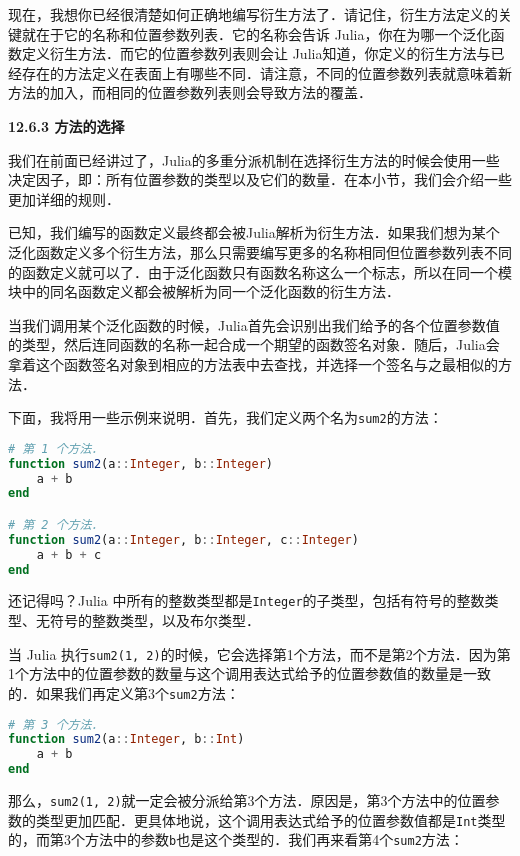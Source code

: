 现在，我想你已经很清楚如何正确地编写衍生方法了．请记住，衍生方法定义的关键就在于它的名称和位置参数列表．它的名称会告诉 Julia，你在为哪一个泛化函数定义衍生方法．而它的位置参数列表则会让 Julia知道，你定义的衍生方法与已经存在的方法定义在表面上有哪些不同．请注意，不同的位置参数列表就意味着新方法的加入，而相同的位置参数列表则会导致方法的覆盖．

\textbf{12.6.3 方法的选择}

我们在前面已经讲过了，Julia的多重分派机制在选择衍生方法的时候会使用一些决定因子，即：所有位置参数的类型以及它们的数量．在本小节，我们会介绍一些更加详细的规则．

已知，我们编写的函数定义最终都会被Julia解析为衍生方法．如果我们想为某个泛化函数定义多个衍生方法，那么只需要编写更多的名称相同但位置参数列表不同的函数定义就可以了．由于泛化函数只有函数名称这么一个标志，所以在同一个模块中的同名函数定义都会被解析为同一个泛化函数的衍生方法．

当我们调用某个泛化函数的时候，Julia首先会识别出我们给予的各个位置参数值的类型，然后连同函数的名称一起合成一个期望的函数签名对象．随后，Julia会拿着这个函数签名对象到相应的方法表中去查找，并选择一个签名与之最相似的方法．

下面，我将用一些示例来说明．首先，我们定义两个名为\verb|sum2|的方法：

\begin{lstlisting}[language=julia]
# 第 1 个方法．
function sum2(a::Integer, b::Integer)
    a + b
end

# 第 2 个方法．
function sum2(a::Integer, b::Integer, c::Integer)
    a + b + c
end
\end{lstlisting}

还记得吗？Julia 中所有的整数类型都是\verb|Integer|的子类型，包括有符号的整数类型、无符号的整数类型，以及布尔类型．

当 Julia 执行\verb|sum2(1, 2)|的时候，它会选择第1个方法，而不是第2个方法．因为第1个方法中的位置参数的数量与这个调用表达式给予的位置参数值的数量是一致的．如果我们再定义第3个\verb|sum2|方法：

\begin{lstlisting}[language=julia]
# 第 3 个方法．
function sum2(a::Integer, b::Int)
    a + b
end
\end{lstlisting}

那么，\verb|sum2(1, 2)|就一定会被分派给第3个方法．原因是，第3个方法中的位置参数的类型更加匹配．更具体地说，这个调用表达式给予的位置参数值都是\verb|Int|类型的，而第3个方法中的参数\verb|b|也是这个类型的．我们再来看第4个\verb|sum2|方法：

